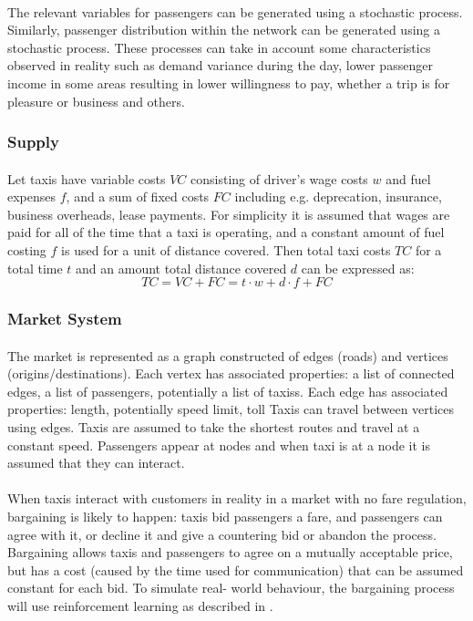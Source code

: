 \paragraph{} The relevant variables for passengers can be generated using a
stochastic process. Similarly, passenger distribution within the network can be
generated using a stochastic process. These processes can take in account some
characteristics observed in reality such as demand variance during the day,
lower passenger income in some areas resulting in lower willingness to pay, whether a trip is for pleasure or business and others.

\subsubsection{Supply} 

\paragraph{} Let taxis have variable costs \(VC\) consisting of driver's wage
costs \(w\) and fuel expenses \(f\), and a sum of fixed costs \(FC\) including
e.g. deprecation, insurance, business overheads, lease payments. For simplicity
it is assumed that wages are paid for all of the time that a taxi is operating,
and a constant amount of fuel costing \(f\) is used for a unit of distance
covered. Then total taxi costs \(TC\) for a total time \(t\) and an amount
total distance covered \(d\) can be expressed as:
\[ TC = VC + FC = t \cdot w + d \cdot f + FC \]

\subsubsection{Market System}

\paragraph{} The market is represented as a graph constructed of edges (roads)
and vertices (origins/destinations). Each vertex has associated properties: a
list of connected edges, a list of passengers, potentially a list of taxiss.
Each edge has associated properties: length, potentially speed limit, toll
Taxis can travel between vertices using edges. Taxis are assumed to take the
shortest routes and travel at a constant speed. Passengers appear at nodes and
when taxi is at a node it is assumed that they can interact.

\paragraph{} When taxis interact with customers in reality in a market with no
fare regulation, bargaining is likely to happen: taxis bid passengers a fare,
and passengers can agree with it, or decline it and give a countering bid or
abandon the process. Bargaining allows taxis and passengers to agree on a
mutually acceptable price, but has a cost (caused by the time used for
communication) that can be assumed constant for each bid. To simulate real-
world behaviour, the bargaining process will use reinforcement learning as
described in \textcite{Cli1997taxi+bargaining}.


